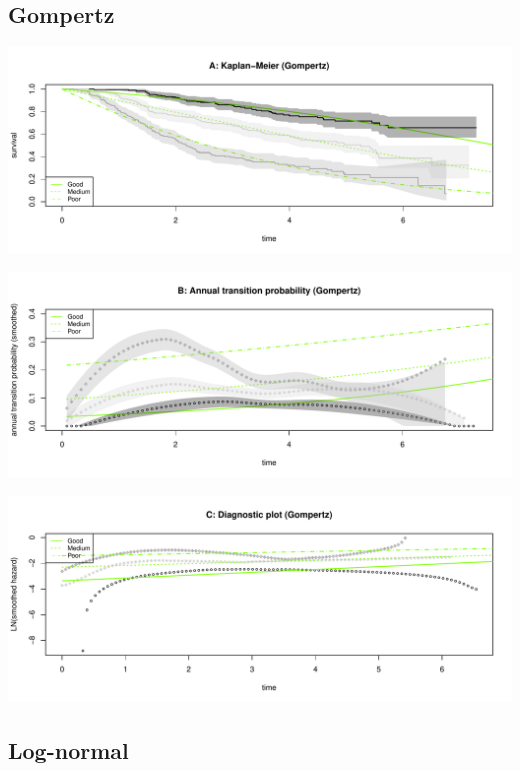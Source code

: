 \documentclass[]{article}
\begin{document}
\subsection{Gompertz}\label{gompertz}

\begin{flushleft}\includegraphics[height=0.3\textheight]{images/gom-1} \end{flushleft}

\begin{flushleft}\includegraphics[height=0.3\textheight]{images/gom-2} \end{flushleft}

\begin{flushleft}\includegraphics[height=0.3\textheight]{images/gom-3} \end{flushleft}

\subsection{Log-normal}\label{log-normal}
\end{document}
